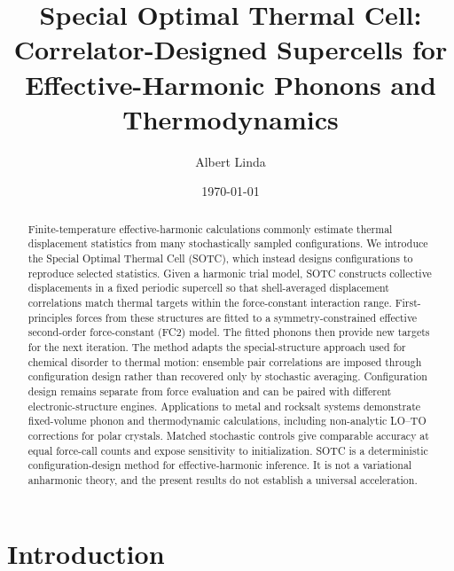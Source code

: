 \documentclass[aps,prb,reprint,amsmath,amssymb,floatfix]{revtex4-2}
\begin{document}
\title{Special Optimal Thermal Cell: Correlator-Designed Supercells for Effective-Harmonic Phonons and Thermodynamics}

\author{Albert Linda}

\date{\today}

\begin{abstract}

Finite-temperature effective-harmonic calculations commonly estimate thermal
displacement statistics from many stochastically sampled configurations. We
introduce the Special Optimal Thermal Cell (SOTC), which instead designs
configurations to reproduce selected statistics. Given a harmonic trial model,
SOTC constructs collective displacements in a fixed periodic supercell so that
shell-averaged displacement correlations match thermal targets within the
force-constant interaction range. First-principles forces from these structures
are fitted to a symmetry-constrained effective second-order force-constant
(FC2) model. The fitted phonons then provide new targets for the next iteration.
The method adapts the special-structure approach used for chemical disorder to
thermal motion: ensemble pair correlations are imposed through configuration
design rather than recovered only by stochastic averaging. Configuration design
remains separate from force evaluation and can be paired with different
electronic-structure engines. Applications to metal and rocksalt systems
demonstrate fixed-volume phonon and thermodynamic calculations, including
non-analytic LO--TO corrections for polar crystals. Matched stochastic controls
give comparable accuracy at equal force-call counts and expose sensitivity to
initialization. SOTC is a deterministic configuration-design method for
effective-harmonic inference. It is not a variational anharmonic theory, and
the present results do not establish a universal acceleration.

\end{abstract}

\maketitle

\section{Introduction}\label{introduction}
\end{document}
